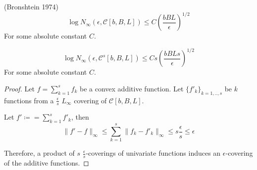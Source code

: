 \begin{lemma} (Bronshtein 1974)
\[
\log N_\infty (\epsilon, \mathcal{C}[b,B,L]) \leq C\left( \frac{bBL}{\epsilon} \right)^{1/2}
\]
For some absolute constant $C$.
\end{lemma}

\begin{lemma}
\[
\log N_\infty( \epsilon, \mathcal{C}^s[b,B,L])  \leq C s \left(\frac{bBLs}{\epsilon}\right)^{1/2}
\]
For some absolute constant $C$.
\end{lemma}

\begin{proof}
Let $f = \sum_{k=1}^s f_k$ be a convex additive function. Let $\{ f'_k \}_{k=1,..,s}$ be $k$ functions from a $\frac{\epsilon}{s}$ $L_\infty$ covering of $\mathcal{C}[b,B,L]$. 

Let $f' \coloneqq = \sum_{k=1}^s f'_k$, then 
\[
\| f' - f \|_{\infty} \leq \sum_{k=1}^s \| f_k - f'_k \|_\infty \leq s \frac{\epsilon}{s} \leq \epsilon
\]

Therefore, a product of $s$ $\frac{\epsilon}{s}$-coverings of univariate functions induces an $\epsilon$-covering of the additive functions.
\end{proof}

 
